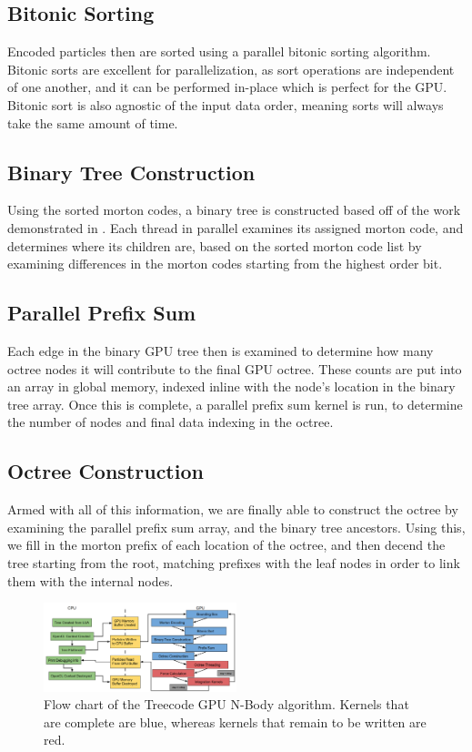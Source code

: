 \documentclass[fleqn,10pt]{SelfArx} %
\begin{document}
\subsection{Bitonic Sorting}
Encoded particles then are sorted using a parallel bitonic sorting algorithm. Bitonic sorts are excellent for parallelization, as sort operations are independent of one another, and it can be performed in-place which is perfect for the GPU. Bitonic sort is also agnostic of the input data order, meaning sorts will always take the same amount of time.

\subsection{Binary Tree Construction}
Using the sorted morton codes, a binary tree is constructed based off of the work demonstrated in \cite{Karras:2012}. Each thread in parallel examines its assigned morton code, and determines where its children are, based on the sorted morton code list by examining differences in the morton codes starting from the highest order bit.

\subsection{Parallel Prefix Sum}
Each edge in the binary GPU tree then is examined to determine how many octree nodes it will contribute to the final GPU octree. These counts are put into an array in global memory, indexed inline with the node’s location in the binary tree array. Once this is complete, a parallel prefix sum kernel is run, to determine the number of nodes and final data indexing in the octree. 

\subsection{Octree Construction}
Armed with all of this information, we are finally able to construct the octree by examining the parallel prefix sum array, and the binary tree ancestors. Using this, we fill in the morton prefix of each location of the octree, and then decend the tree starting from the root, matching prefixes with the leaf nodes in order to link them with the internal nodes.

\begin{figure}[h]
    \centering
    \includegraphics[width=0.5\textwidth]{GPUTreecode.png}
    \caption{Flow chart of the Treecode GPU N-Body algorithm. Kernels that are complete are blue, whereas kernels that remain to be written are red.}
\end{figure}
\end{document}
